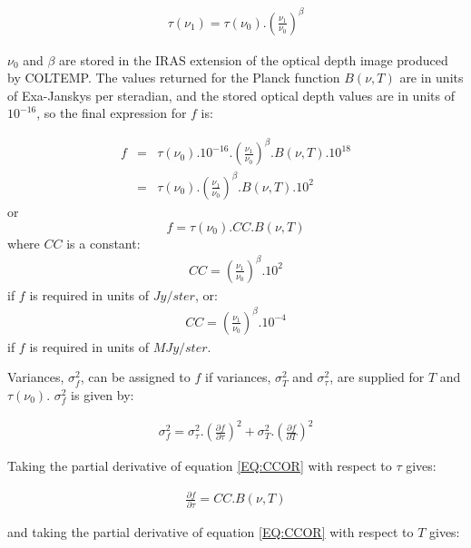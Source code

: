 \begin{eqnarray*}
\tau(\nu_{1}) = \tau(\nu_{0}) . \left(\frac{\nu_{1}}{\nu_{0}}\right)^{\beta}
\end{eqnarray*}

$\nu_{0}$ and $\beta$ are stored in the {\small IRAS} extension of the optical
depth image produced by {\small COLTEMP}. The values returned for the Planck
function $B(\nu, T)$ are in units of Exa-Janskys per steradian, and the stored
optical depth values are in units of $10^{-16}$, so the final expression for $f$
is:

\begin{eqnarray*}
f & = & \tau(\nu_{0}).10^{-16}.\left(\frac{\nu_{1}}{\nu_{0}}\right)^{\beta}.
        B( \nu, T ).10^{18}\\
  & = & \tau(\nu_{0}).\left(\frac{\nu_{1}}{\nu_{0}}\right)^{\beta}.
        B( \nu, T ).10^{2}
\end{eqnarray*}
or
\begin{equation}
\label{EQ:CCOR}
  f = \tau(\nu_{0}).CC.B( \nu, T )
\end{equation}
where $CC$ is a constant:
\begin{eqnarray*}
CC  =  \left(\frac{\nu_{1}}{\nu_{0}}\right)^{\beta}.10^{2}
\end{eqnarray*}
if $f$ is required in units of $Jy/ster$, or:
\begin{eqnarray*}
CC  =  \left(\frac{\nu_{1}}{\nu_{0}}\right)^{\beta}.10^{-4}
\end{eqnarray*}
if $f$ is required in units of $MJy/ster$.

Variances, $\sigma_{f}^{2}$, can be assigned to $f$ if variances,
$\sigma_{T}^{2}$ and $\sigma_{\tau}^{2}$, are supplied for $T$ and
$\tau(\nu_{0})$. $\sigma_{f}^{2}$ is given by:

\begin{eqnarray*}
\sigma_{f}^{2} = \sigma_{\tau}^{2}.\left( \frac{\partial f}{\partial
\tau}\right)^{2} + \sigma_{T}^{2}.\left( \frac{\partial f}{\partial T}\right)^{2}
\end{eqnarray*}

Taking the partial derivative of equation \ref{EQ:CCOR} with respect to $\tau$
gives:

\begin{eqnarray*}
\frac{\partial f}{\partial \tau} = CC.B(\nu, T )
\end{eqnarray*}

and taking the partial derivative of equation \ref{EQ:CCOR} with respect to
$T$ gives:

